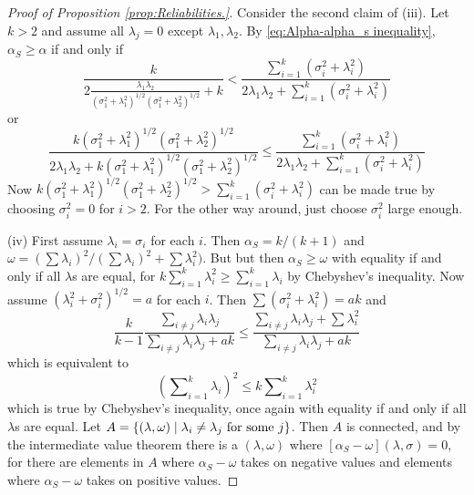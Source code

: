 \documentclass[twoside]{article}
\DeclareMathOperator{\tsum}{\textstyle \sum}
\renewcommand{\sqrt}[1]{{(#1)^{1/2}}}
\begin{document}
\begin{proof}[Proof of Proposition \ref{prop:Reliabilities.}]
Consider the second claim of (iii). Let $k>2$ and assume all $\lambda_{j}=0$
except $\lambda_{1},\lambda_{2}$. By \eqref{eq:Alpha-alpha_s inequality}, $\alpha_S \geq \alpha$ if and
only if
\[
\frac{k}{2\frac{\lambda_{1}\lambda_{2}}{\sqrt{\sigma_{1}^{2}+\lambda_{1}^{2}}\sqrt{\sigma_{1}^{2}+\lambda_{2}^{2}}}+k}<\frac{\tsum_{i=1}^{k}(\sigma_{i}^{2}+\lambda_{i}^{2})}{2\lambda_{1}\lambda_{2}+\tsum_{i=1}^{k}(\sigma_{i}^{2}+\lambda_{i}^{2})}
\]
or
\begin{equation*}
\frac{k\sqrt{\sigma_{1}^{2}+\lambda_{1}^{2}}\sqrt{\sigma_{1}^{2}+\lambda_{2}^{2}}}{2\lambda_{1}\lambda_{2}+k\sqrt{\sigma_{1}^{2}+\lambda_{1}^{2}}\sqrt{\sigma_{1}^{2}+\lambda_{2}^{2}}} \leq \frac{\tsum_{i=1}^{k}(\sigma_{i}^{2}+\lambda_{i}^{2})}{2\lambda_{1}\lambda_{2}+\tsum_{i=1}^{k}(\sigma_{i}^{2}+\lambda_{i}^{2})}
\end{equation*}
Now $k\sqrt{\sigma_{1}^{2}+\lambda_{1}^{2}}\sqrt{\sigma_{1}^{2}+\lambda_{2}^{2}}>\tsum_{i=1}^{k}(\sigma_{i}^{2}+\lambda_{i}^{2})$
can be made true by choosing $\sigma_{i}^{2}=0$ for $i>2$. For the
other way around, just choose $\sigma_{i}^{2}$ large enough.

(iv) First assume $\lambda_{i}=\sigma_{i}$ for each $i$. Then $\alpha_S=k/(k+1)$
and $\omega=(\tsum\lambda_{i})^{2}/(\tsum\lambda_{i})^{2}+\tsum\lambda_{i}^{2})$.
But but then $\alpha_S\geq\omega$ with equality if and only if
all $\lambda$s are equal, for $k\tsum_{i=1}^{k}\lambda_{i}^{2}\geq\tsum_{i=1}^{k}\lambda_{i}$
by Chebyshev's inequality. Now assume $\sqrt{\lambda_{i}^{2}+\sigma_{i}^{2}}=a$
for each $i$. Then $\tsum(\sigma_{i}^{2}+\lambda_{i}^{2})=ak$
and
\[
\frac{k}{k-1}\frac{\tsum_{i\neq j}\lambda_{i}\lambda_{j}}{\tsum_{i\neq j}\lambda_{i}\lambda_{j}+ak}\leq\frac{\tsum_{i\neq j}\lambda_{i}\lambda_{j}+\tsum\lambda_{i}^{2}}{\tsum_{i\neq j}\lambda_{i}\lambda_{j}+ak}
\]
which is equivalent to
\begin{equation*}
(\tsum_{i=1}^{k}\lambda_{i})^{2} \leq k\tsum_{i=1}^{k}\lambda_{i}^{2}
\end{equation*}
which is true by Chebyshev's inequality, once again with equality
if and only if all $\lambda$s are equal. Let $A=\{ (\lambda,\omega)\mid\lambda_{i}\neq\lambda_{j}\text{\textrm{ for some }}j\} $.
Then $A$ is connected, and by the intermediate value theorem there
is a $(\lambda,\omega)$ where $[\alpha_S-\omega](\lambda,\sigma)=0$,
for there are elements in $A$ where $\alpha_S-\omega$ takes on
negative values and elements where $\alpha_S-\omega$ takes on positive
values.
\end{proof}
\end{document}
